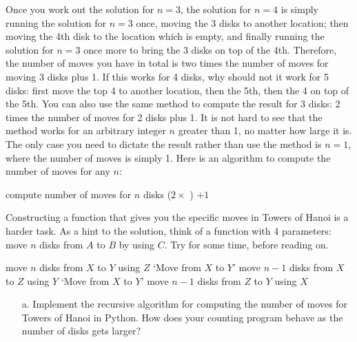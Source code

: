 \documentclass[a4paper]{article}
\begin{document}
{\begin{itemize}
\begin{uexample}
Once you work out the solution for $n=3$, the solution for $n=4$ is simply
running the solution for $n=3$ once,  moving the 3 disks to another location;
then moving the 4th disk to the location which is empty, and finally running the
solution for $n=3$ once more to bring the 3 disks on top of the 4th. Therefore,
the number of moves you have in total is two times the number of moves for
moving 3 disks plus 1. If this works for 4 disks, why should not it work for 5
disks: first move the top 4 to another location, then the 5th, then the 4 on top
of the 5th. You can also use the same method to compute the result for 3 disks:
2 times the number of moves for 2 disks plus 1. It is not hard to see that the
method works for an arbitrary integer $n$ greater than 1, no matter how large it
is. The only case you need to dictate the result rather than use the method is
$n=1$, where the number of moves is simply 1. Here is an algorithm to compute
the number of moves for any $n$:

\begin{ucodeframe}
\hspace{1em}
\begin{algorithmic}
 \Comment compute number of moves for $n$ disks
\State{}
\Else
\State\Return ($2\times$ ) $+1$
	\EndIf
\EndFunction
\end{algorithmic}
\end{ucodeframe}


\end{uexample}

\begin{uexample}
Constructing a function that gives you the specific moves in Towers of Hanoi is a harder task. 
As a hint to the solution, think of a function with 4 parameters:
move $n$ disks from $A$ to $B$ by using $C$. Try for some time, before reading
on.


\begin{ualgorithmic}
 \Comment move $n$ disks from $X$ to $Y$ using $Z$
		\State\Print `Move from $X$ to $Y$' 
	\Else
		\State{} \Comment move $n-1$ disks from $X$ to $Z$ using $Y$
		\State\Print `Move from $X$ to $Y$'
		\State{} \Comment move $n-1$ disks from $Z$ to $Y$ using $X$
	\EndIf
\EndFunction
\end{ualgorithmic}
\end{uexample}

\hrulefill
\begin{uexercise}
\begin{itemize}
\item[]
\item[a.] Implement the recursive algorithm for computing the number of moves for Towers of Hanoi in Python. How does your counting
program behave as the number of disks gets larger?


\end{itemize}
\end{uexercise}
\end{itemize}}
\end{document}
